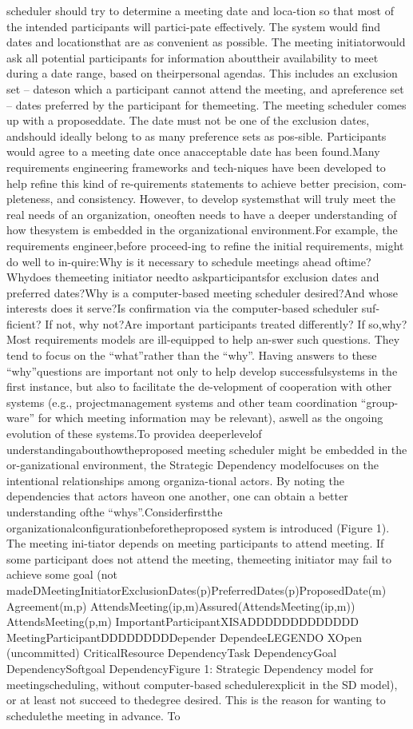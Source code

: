 scheduler should try to determine a meeting date and loca-tion so that most of the intended participants will partici-pate effectively. The system would ﬁnd dates and locationsthat are as convenient as possible. The meeting initiatorwould ask all potential participants for information abouttheir availability to meet during a date range, based on theirpersonal agendas. This includes an exclusion set – dateson which a participant cannot attend the meeting, and apreference set – dates preferred by the participant for themeeting. The meeting scheduler comes up with a proposeddate. The date must not be one of the exclusion dates, andshould ideally belong to as many preference sets as pos-sible. Participants would agree to a meeting date once anacceptable date has been found.Many requirements engineering frameworks and tech-niques have been developed to help reﬁne this kind of re-quirements statements to achieve better precision, com-pleteness, and consistency. However, to develop systemsthat will truly meet the real needs of an organization, oneoften needs to have a deeper understanding of how thesystem is embedded in the organizational environment.For example, the requirements engineer,before proceed-ing to reﬁne the initial requirements, might do well to in-quire:Why is it necessary to schedule meetings ahead oftime?Whydoes themeeting initiator needto askparticipantsfor exclusion dates and preferred dates?Why is a computer-based meeting scheduler desired?And whose interests does it serve?Is conﬁrmation via the computer-based scheduler suf-ﬁcient? If not, why not?Are important participants treated differently? If so,why?Most requirements models are ill-equipped to help an-swer such questions. They tend to focus on the “what”rather than the “why”. Having answers to these “why”questions are important not only to help develop successfulsystems in the ﬁrst instance, but also to facilitate the de-velopment of cooperation with other systems (e.g., projectmanagement systems and other team coordination “group-ware” for which meeting information may be relevant), aswell as the ongoing evolution of these systems.To providea deeperlevelof understandingabouthowtheproposed meeting scheduler might be embedded in the or-ganizational environment, the Strategic Dependency modelfocuses on the intentional relationships among organiza-tional actors. By noting the dependencies that actors haveon one another, one can obtain a better understanding ofthe “whys”.Considerﬁrstthe organizationalconﬁgurationbeforetheproposed system is introduced (Figure 1). The meeting ini-tiator depends on meeting participants to attend meeting. If some participant does not attend the meeting, themeeting initiator may fail to achieve some goal (not madeDMeetingInitiatorExclusionDates(p)PreferredDates(p)ProposedDate(m) Agreement(m,p)  AttendsMeeting(ip,m)Assured(AttendsMeeting(ip,m))  AttendsMeeting(p,m) ImportantParticipantXISADDDDDDDDDDDDD MeetingParticipantDDDDDDDDDepender DependeeLEGENDO  XOpen (uncommitted) CriticalResource DependencyTask DependencyGoal DependencySoftgoal DependencyFigure 1: Strategic Dependency model for meetingscheduling, without computer-based schedulerexplicit in the SD model), or at least not succeed to thedegree desired. This is the reason for wanting to schedulethe meeting in advance. To 